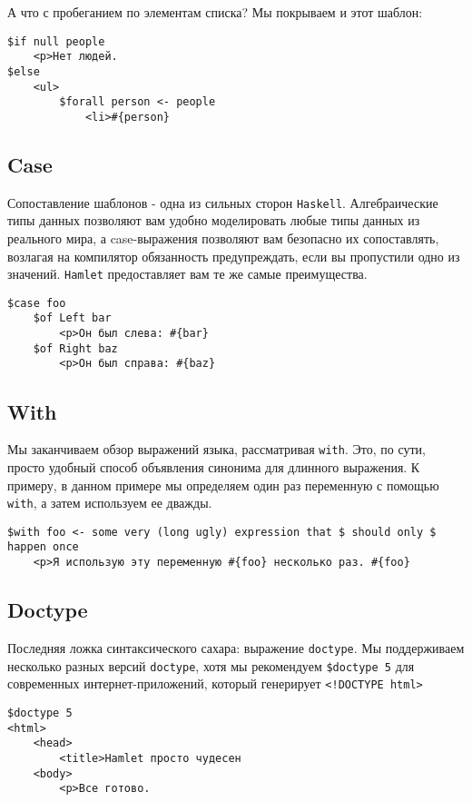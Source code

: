 А что с пробеганием по элементам списка? Мы покрываем и этот шаблон:

\begin{lstlisting}
$if null people
    <p>Нет людей.
$else
    <ul>
        $forall person <- people
            <li>#{person}
\end{lstlisting}


\subsection{Case}

Сопоставление шаблонов - одна из сильных сторон \texttt{Haskell}. Алгебраические типы данных
позволяют вам удобно моделировать любые типы данных из реального мира, а 
case-выражения позволяют вам безопасно их сопоставлять, возлагая на компилятор
обязанность предупреждать, если вы пропустили одно из значений.
\texttt{Hamlet} предоставляет вам те же самые преимущества.

\begin{lstlisting}
$case foo
    $of Left bar
        <p>Он был слева: #{bar}
    $of Right baz
        <p>Он был справа: #{baz}
\end{lstlisting}

\subsection{With}

Мы заканчиваем обзор выражений языка, рассматривая \texttt{with}. Это, по сути,
просто удобный способ объявления синонима для длинного выражения. К примеру, 
в данном примере мы определяем один раз переменную с помощью \texttt{with}, а затем
используем ее дважды.

\begin{lstlisting}
$with foo <- some very (long ugly) expression that $ should only $ happen once
    <p>Я использую эту переменную #{foo} несколько раз. #{foo}
\end{lstlisting}

\subsection{Doctype}
Последняя ложка синтаксического сахара: выражение \texttt{doctype}. Мы
поддерживаем несколько разных версий \texttt{doctype}, хотя мы рекомендуем
\lstinline!$doctype 5! для современных интернет-приложений, который генерирует
\lstinline'<!DOCTYPE html>'

\begin{lstlisting}
$doctype 5
<html>
    <head>
        <title>Hamlet просто чудесен
    <body>
        <p>Все готово.
\end{lstlisting}

